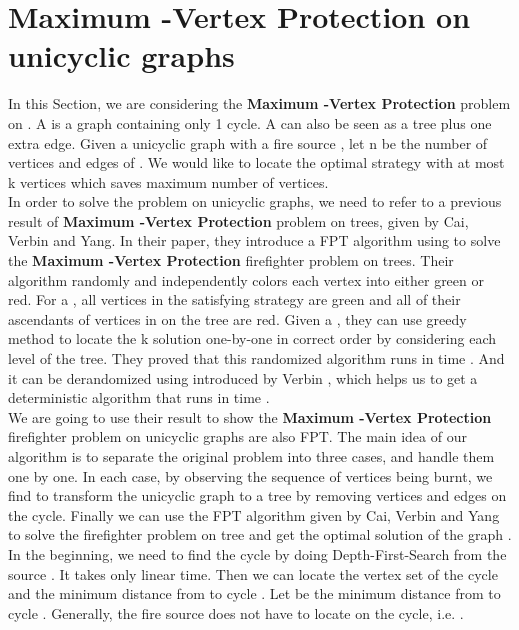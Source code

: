 \documentclass[11pt,letter]{article}
\begin{document}
\section{Maximum -Vertex Protection on unicyclic graphs}

In this Section, we are considering the \textbf{Maximum -Vertex Protection} problem on  . A  is a graph containing only 1 cycle. A  can also be seen as a tree plus one extra edge. Given a unicyclic graph  with a fire source , let n be the number of vertices and edges of . We would like to locate the optimal strategy  with at most k vertices which saves maximum number of vertices.\\

In order to solve the problem on unicyclic graphs, we need to refer to a previous result of \textbf{Maximum -Vertex Protection} problem on trees, given by Cai, Verbin and Yang\cite{CVY08}. In their paper, they introduce a FPT algorithm using  to solve the \textbf{Maximum -Vertex Protection} firefighter problem on trees. Their algorithm randomly and independently colors each vertex into either green or red. For a , all vertices in the satisfying strategy  are green and all of their ascendants of vertices in  on the tree are red. Given a , they can use greedy method to locate the k solution one-by-one in correct order by considering each level of the tree. They proved that this randomized algorithm runs in time . And it can be derandomized using  introduced by Verbin \cite{Ver}, which helps us to get a deterministic algorithm that runs in time .\\

We are going to use their result to show the \textbf{Maximum -Vertex Protection} firefighter problem on unicyclic graphs are also FPT. The main idea of our algorithm is to separate the original problem into three cases, and handle them one by one. In each case, by observing the sequence of vertices being burnt, we find to transform the unicyclic graph  to a tree  by removing vertices and edges on the cycle. Finally we can use the FPT algorithm given by Cai, Verbin and Yang to solve the firefighter problem on tree  and get the optimal solution of the graph .\\

In the beginning, we need to find the cycle  by doing Depth-First-Search from the source . It takes only linear time. Then we can locate the vertex set  of the cycle and the minimum distance from  to cycle . Let  be the minimum distance from  to cycle . Generally, the fire source does not have to locate on the cycle, i.e. .\\
\end{document}
